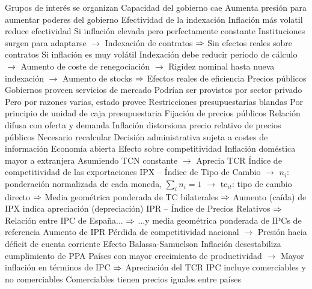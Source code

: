 \documentclass{nuevotema}
\begin{document}
\begin{esquemal}
				\4[] Grupos de interés se organizan
				\4[] Capacidad del gobierno cae
				\4[] Aumenta presión para aumentar poderes del gobierno
			\3 Efectividad de la indexación
				\4 Inflación más volatil reduce efectividad
				\4 Si inflación elevada pero perfectamente constante
				\4[] Instituciones surgen para adaptarse
				\4[] $\to$ Indexación de contratos
				\4[] $\Rightarrow$ Sin efectos reales sobre contratos
				\4 Si inflación es muy volátil
				\4[] Indexación debe reducir periodo de cálculo
				\4[] $\to$ Aumento de coste de renegociación
				\4[] $\to$ Rigidez nominal hasta nueva indexación
				\4[] $\to$ Aumento de stocks
				\4[] $\Rightarrow$ Efectos reales de eficiencia
			\3 Precios públicos
				\4 Gobiernos proveen servicios de mercado
				\4[] Podrían ser provistos por sector privado
				\4[] Pero por razones varias, estado provee
				\4 Restricciones presupuestarias blandas
				\4[] Por principio de unidad de caja presupuestaria
				\4 Fijación de precios públicos
				\4[] Relación difusa con oferta y demanda
				\4 Inflación distorsiona precio relativo de precios públicos
				\4[] Necesario recalcular
				\4[] Decisión administrativa sujeta a costes de información
		\2 Economía abierta
			\3 Efecto sobre competitividad
				\4 Inflación doméstica mayor a extranjera
				\4[] Asumiendo TCN constante
				\4[] $\to$ Aprecia TCR
				\4 Índice de competitividad de las exportaciones
				\4[] 
				\4 IPX -- Índice de Tipo de Cambio
				\4[] 
				\4[] $\to$ $n_i$: ponderación normalizada de cada moneda, $\sum_i n_i = 1$
				\4[] $\to$ $\text{tc}_{it}$: tipo de cambio directo
				\4[] $\Rightarrow$ Media geométrica ponderada de TC bilaterales
				\4[] $\Rightarrow$ Aumento (caída) de IPX indica apreciación (depreciación)
				\4 IPR -- Índice de Precios Relativos
				\4[] 
				\4[] $\Rightarrow$ Relación entre IPC de España...
				\4[] $\Rightarrow$ ...y media geométrica ponderada de IPCs de referencia
				\4 Aumento de IPR
				\4[] Pérdida de competitividad nacional
				\4[] $\to$ Presión hacia déficit de cuenta corriente
			\3 Efecto Balassa-Samuelson
				\4 Inflación desestabiliza cumplimiento de PPA
				\4[] Países con mayor crecimiento de productividad
				\4[] $\to$ Mayor inflación en términos de IPC
				\4[] $\Rightarrow$ Apreciación del TCR
				\4 IPC incluye comerciables y no comerciables
				\4[] Comerciables tienen precios iguales entre países

\end{esquemal}
\end{document}
